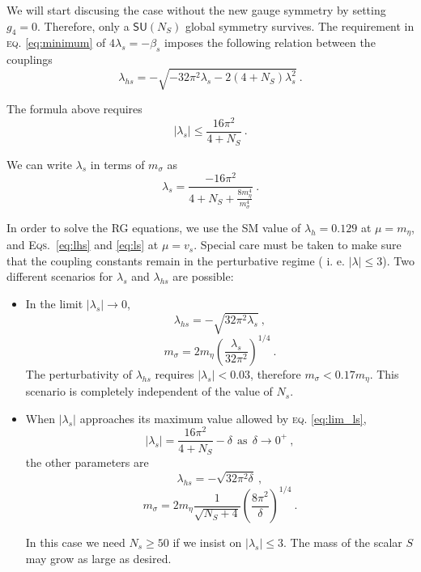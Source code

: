 \documentclass[aps,prd,preprintnumbers,nofootinbibn,twocolumn]{revtex4}
\begin{document}
We will start discusing the case without the new gauge symmetry by setting $g_4=0$. Therefore, only a $\mathsf{SU}(N_S)$ global symmetry survives. The requirement in \textsc{eq.} \eqref{eq:minimum} of $4\lambda_s = -\beta_s$ imposes the following relation between the couplings
\begin{equation}\label{eq:lhs}
\lambda_{hs}=-\sqrt{-32\pi^2 \lambda_s -2(4+N_S)\lambda_s^2}\ .
\end{equation}

The formula above requires
\begin{equation}
|\lambda_s| \leq \frac{16\pi^2}{4+N_S}\ . \label{eq:lim_ls}
\end{equation}

We can write $\lambda_s$ in terms of $m_\sigma$ as
\begin{equation}\label{eq:ls}
\lambda_s = \frac{-16\pi^2}{4+N_S+\frac{8m_\eta^4}{m_\sigma^4}}\ .
\end{equation}


In order to solve the RG equations, we use the SM value of $\lambda_h = 0.129$ at $\mu = m_\eta$, and \textsc{Eqs.}\ \eqref{eq:lhs} and \eqref{eq:ls} at $\mu=v_s$. Special care must be taken to make sure that the coupling constants remain in the perturbative regime ( i. e. $|\lambda| \leq 3$). Two different scenarios for $\lambda_s$ and $\lambda_{hs}$ are possible:
\begin{itemize}
\item In the limit $|\lambda_s|\to 0$,
\begin{equation}
\lambda_{hs} = -\sqrt{32\pi^2 \lambda_s}\ ,
\end{equation}
\begin{equation}
m_\sigma = 2 m_\eta \left(\frac{\lambda_s}{32\pi^2}\right)^{1/4}\ .
\end{equation}
The perturbativity of $\lambda_{hs}$ requires $|\lambda_s| < 0.03$, therefore $m_\sigma < 0.17 m_\eta$. This scenario is completely independent of the value of $N_s$.

\item When $|\lambda_s|$ approaches its maximum value allowed by \textsc{eq.} \eqref{eq:lim_ls},
\begin{equation}
|\lambda_s| = \frac{16\pi^2}{4+N_S} - \delta \ \ \mathrm{as}\ \ \delta\to 0^+\ ,
\end{equation}
the other parameters are
\begin{equation}
\lambda_{hs} = -\sqrt{32\pi^2 \delta}\ ,
\end{equation}
\begin{equation}
m_\sigma = 2 m_\eta \frac{1}{\sqrt{N_S + 4 }}\left(\frac{8\pi^2}{\delta}\right)^{1/4}\ .
\end{equation}

In this case we need $N_s \geq 50$ if we insist on $|\lambda_s| \leq 3$. The mass of the scalar $S$ may grow as large as desired.
\end{itemize}
\end{document}

